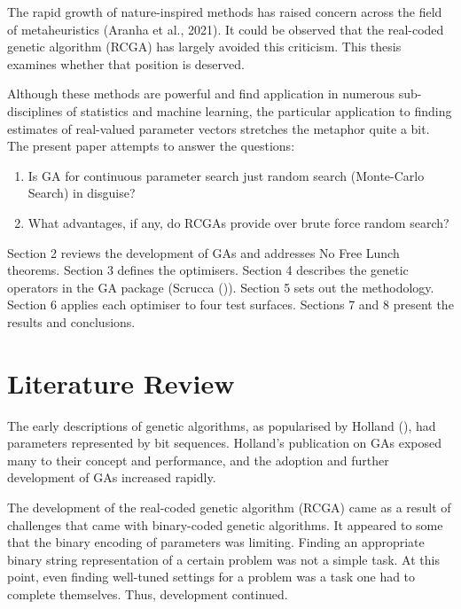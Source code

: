 \documentclass[
  a4paper,
]{article}
\providecommand{\tightlist}{%
  \setlength{\itemsep}{0pt}\setlength{\parskip}{0pt}}\usepackage{longtable,booktabs,array}
\newcommand{\+}{\phantom{-}}
\begin{document}
The rapid growth of nature-inspired methods has raised concern across
the field of metaheuristics (Aranha et al., 2021). It could be observed
that the real-coded genetic algorithm (RCGA) has largely avoided this
criticism. This thesis examines whether that position is deserved.

Although these methods are powerful and find application in numerous
sub-disciplines of statistics and machine learning, the particular
application to finding estimates of real-valued parameter vectors
stretches the metaphor quite a bit. The present paper attempts to answer
the questions:

\begin{enumerate}
\def\labelenumi{\arabic{enumi})}
\tightlist
\item
  Is GA for continuous parameter search just random search (Monte-Carlo
  Search) in disguise?
\item
  What advantages, if any, do RCGAs provide over brute force random
  search?
\end{enumerate}

Section 2 reviews the development of GAs and addresses No Free Lunch
theorems. Section 3 defines the optimisers. Section 4 describes the
genetic operators in the GA package (Scrucca
()). Section 5 sets out the methodology.
Section 6 applies each optimiser to four test surfaces. Sections 7 and 8
present the results and conclusions.

\newpage

\section{Literature Review}\label{literature-review}

The early descriptions of genetic algorithms, as popularised by Holland
(), had parameters represented by bit
sequences. Holland's publication on GAs exposed many to their concept
and performance, and the adoption and further development of GAs
increased rapidly.

The development of the real-coded genetic algorithm (RCGA) came as a
result of challenges that came with binary-coded genetic algorithms. It
appeared to some that the binary encoding of parameters was limiting.
Finding an appropriate binary string representation of a certain problem
was not a simple task. At this point, even finding well-tuned settings
for a problem was a task one had to complete themselves. Thus,
development continued.
\end{document}
